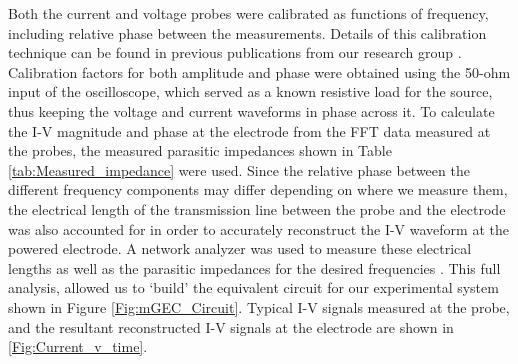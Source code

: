 \documentclass[12pt]{iopart}
\begin{document}
 Both the current and voltage probes were calibrated as functions of frequency, including relative phase between the measurements. Details of this calibration technique can be found in previous publications from our research group \cite{press2020electrical}. Calibration factors for both amplitude and phase were obtained using the 50-ohm input of the oscilloscope, which served as a known resistive load for the source, thus keeping the voltage and current waveforms in phase across it. To calculate the I-V magnitude and phase at the electrode from the FFT data measured at the probes, the measured parasitic impedances shown in Table \ref{tab:Measured_impedance} were used. Since the relative phase between the different frequency components may differ depending on where we measure them, the electrical length of the transmission line between the probe and the electrode was also accounted for in order to accurately reconstruct the I-V waveform at the powered electrode. A network analyzer was used to measure these electrical lengths as well as the parasitic impedances for the desired frequencies \cite{press2020electrical}.  This full analysis, allowed us to `build' the equivalent circuit for our experimental system shown in Figure \ref{Fig:mGEC_Circuit}.  Typical I-V signals measured at the probe, and the resultant reconstructed I-V signals at the electrode are shown in \ref{Fig:Current_v_time}.
\end{document}
